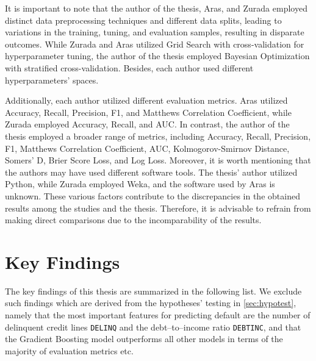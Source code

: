 It is important to note that the author of the thesis, Aras, and Zurada employed distinct data preprocessing techniques and different data splits, leading to variations in the training, tuning, and evaluation samples, resulting in disparate outcomes.
While Zurada and Aras utilized Grid Search with cross-validation for hyperparameter tuning, the author of the thesis employed Bayesian Optimization with stratified cross-validation. Besides, each author used different hyperparameters' spaces.

Additionally, each author utilized different evaluation metrics. Aras utilized Accuracy, Recall, Precision, F1, and Matthews Correlation Coefficient, while Zurada employed Accuracy, Recall, and AUC.
In contrast, the author of the thesis employed a broader range of metrics, including Accuracy, Recall, Precision, F1, Matthews Correlation Coefficient, AUC, Kolmogorov-Smirnov Distance, Somers' D, Brier Score Loss, and Log Loss.
Moreover, it is worth mentioning that the authors may have used different software tools. The thesis' author utilized Python, while Zurada employed Weka, and the software used by Aras is unknown.
These various factors contribute to the discrepancies in the obtained results among the studies and the thesis. Therefore, it is advisable to refrain from making direct comparisons due to the incomparability of the results.
\vspace{0.3cm}

\newpage
\section{Key Findings}
\label{sec:keyfindings}
The key findings of this thesis are summarized in the following list. We exclude such findings which are derived from the hypotheses' testing in \autoref{sec:hypotest}, namely that the most important features for predicting default are the number of delinquent credit lines \texttt{DELINQ} and the debt--to--income ratio \texttt{DEBTINC}, and that the Gradient Boosting model outperforms all other models in terms of the majority of evaluation metrics etc.

